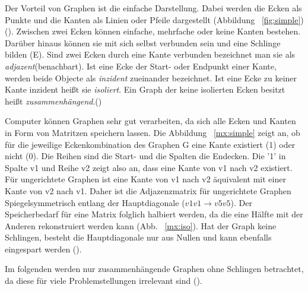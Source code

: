 \documentclass[12pt,a4paper]{article}
\begin{document}
Der Vorteil von Graphen ist die einfache Darstellung. Dabei werden die Ecken als Punkte und die Kanten als Linien oder Pfeile dargestellt (Abbildung ~\ref{fig:simple}) (\cite[49]{kurt}). Zwischen zwei Ecken können einfache, mehrfache oder keine Kanten bestehen. Darüber hinaus können sie mit sich selbst verbunden sein und eine Schlinge bilden (E). Sind zwei Ecken durch eine Kante verbunden bezeichnet man sie als \textit{adjazent}(benachbart). Ist eine Ecke der Start- oder Endpunkt einer Kante, werden beide Objecte als \textit{inzident} zueinander bezeichnet. Ist eine Ecke zu keiner Kante inzident heißt sie \textit{isoliert}. Ein Graph der keine isolierten Ecken besitzt heißt \textit{zusammenhängend}.(\cite[4--5]{theory}) \par

Computer können Graphen sehr gut verarbeiten, da sich alle Ecken und Kanten in Form von Matritzen speichern lassen. Die Abbildung ~\ref{mx:simple} zeigt an, ob für die jeweilige Eckenkombination des Graphen G eine Kante existiert (1) oder nicht (0). Die Reihen sind die Start- und die Spalten die Endecken. Die '1' in Spalte v1 und Reihe v2 zeigt also an, dass eine Kante von v1 nach v2 existiert. Für ungerichtete Graphen ist eine Kante von v1 nach v2 äquivalent mit einer Kante von v2 nach v1. Daher ist die Adjazenzmatrix für ungerichtete Graphen Spiegelsymmetrisch entlang der Hauptdiagonale ($v1v1 \rightarrow v5v5$). Der Speicherbedarf für eine Matrix folglich halbiert werden, da die eine Hälfte mit der Anderen rekonstruiert werden kann (Abb. ~\ref{mx:iso}). Hat der Graph keine Schlingen, besteht die Hauptdiagonale nur aus Nullen und kann ebenfalls eingespart werden (\cite[19]{algorithms}).

Im folgenden werden nur zusammenhängende Graphen ohne Schlingen betrachtet, da diese für viele Problemstellungen irrelevant sind (\cite[4f]{theory}).
\end{document}
